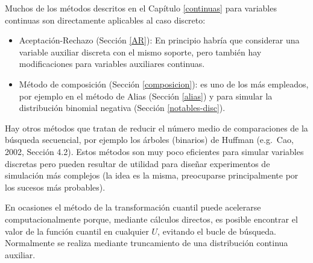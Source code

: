 \documentclass[
  spanish,
  10pt,
]{book}
\theoremstyle{break}
\theoremstyle{nonumberplain}
\begin{document}
Muchos de los métodos descritos en el Capítulo \ref{continuas} para variables continuas son directamente aplicables al caso discreto:

\begin{itemize}
\item
  Aceptación-Rechazo (Sección \ref{AR}): En principio habría que considerar una variable auxiliar discreta con el mismo soporte, pero también hay modificaciones para variables auxiliares continuas.
\item
  Método de composición (Sección \ref{composicion}): es uno de los más empleados, por ejemplo en el método de Alias (Sección \ref{alias}) y para simular la distribución binomial negativa (Sección \ref{notables-disc}).
\end{itemize}

Hay otros métodos que tratan de reducir el número medio de comparaciones de la búsqueda secuencial, por ejemplo los árboles (binarios) de Huffman (e.g.~Cao, 2002, Sección 4.2).
Estos métodos son muy poco eficientes para simular variables discretas pero pueden resultar de utilidad para diseñar experimentos de simulación más complejos (la idea es la misma, preocuparse principalmente por los sucesos más probables).

En ocasiones el método de la transformación cuantil puede acelerarse computacionalmente porque, mediante cálculos directos, es posible encontrar el valor de la función cuantil en cualquier \(U\), evitando el bucle de búsqueda.
Normalmente se realiza mediante truncamiento de una distribución continua auxiliar.
\end{document}
